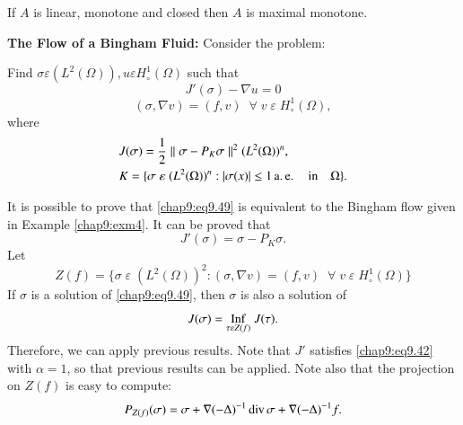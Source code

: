 \begin{REM}\label{chap9:rem6}
If $A$ is linear, monotone and closed then $A$ is maximal monotone.
\end{REM}

\begin{exam}\label{chap9:exm8}
{\bf The Flow of a Bingham Fluid:} Consider the problem:

Find $\sigma \varepsilon (L^2(\Omega)), u\varepsilon
H_\circ^1(\Omega)$ such that 
\begin{equation}\label{chap9:eq9.49}
J'(\sigma)-\nabla u=0
\end{equation}
$$
(\sigma,\nabla v)=(f,v)\; \; \forall \;v \;\varepsilon
\;H_\circ^1(\Omega),
$$
where\pageoriginale
\begin{align*}
&J(\sigma)=\frac{1}{2}\parallel\sigma
-P_K\sigma\parallel^2(L^2(\Omega))^n,\\
&K=\{\sigma \;\varepsilon \;(L^2(\Omega))^n:|\sigma(x)|\leq 1 \operatorname{a.e.}
\quad\text{in}\quad\Omega\}.
\end{align*}

It is possible to prove that \eqref{chap9:eq9.49} is equivalent to the
Bingham flow given in Example \ref{chap9:exm4}. It can be proved that 
$$
J'(\sigma)=\sigma -P_K\sigma.
$$
Let
$$
Z(f)=\{\sigma \;\varepsilon \;(L^2(\Omega))^2:(\sigma, \nabla v)=(f,v)
\; \;\forall \;v \;\varepsilon \;H_\circ^1(\Omega)\}
$$
If $\sigma$ is a solution of \eqref{chap9:eq9.49}, then $\sigma$ is
also a solution of 
\begin{equation}\label{chap9:eq9.50}
J(\sigma)=\underset{\tau\varepsilon Z(f)}{\operatorname{Inf}} \;J(\tau).
\end{equation}
Therefore, we can apply previous results. Note that $J'$ satisfies
\eqref{chap9:eq9.42} with $\alpha =1$, so that previous results can be
applied. Note also that the projection on $Z(f)$ is easy to compute:
$$
P_{Z(f)}(\sigma)=\sigma +\nabla(-\Delta)^{-1}\operatorname{div}\sigma +\nabla
(-\Delta)^{-1}f.
$$
\end{exam}

